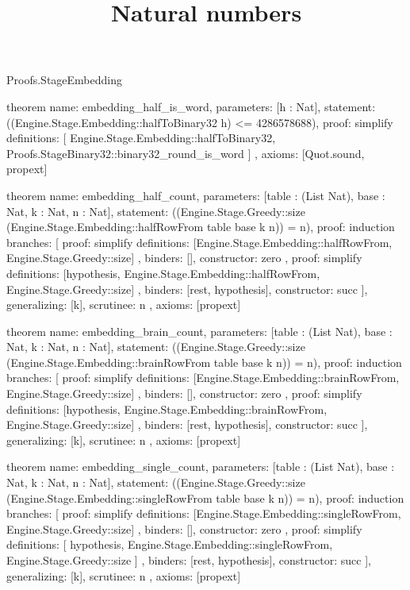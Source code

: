 \begin{lexlean}{Proofs.StageEmbedding}
\title{Natural numbers}
\begin{semanticmodule}
theorem{
  name: embedding_half_is_word,
  parameters: [h : Nat],
  statement: ((Engine.Stage.Embedding::halfToBinary32 h) <= 4286578688),
  proof: simplify{
    definitions: [
      Engine.Stage.Embedding::halfToBinary32,
      Proofs.StageBinary32::binary32_round_is_word
    ]
  },
  axioms: [Quot.sound, propext]
}

theorem{
  name: embedding_half_count,
  parameters: [table : (List Nat), base : Nat, k : Nat, n : Nat],
  statement: ((Engine.Stage.Greedy::size (Engine.Stage.Embedding::halfRowFrom table base k n)) = n),
  proof: induction{
    branches: [
      {
        proof: simplify{
          definitions: [Engine.Stage.Embedding::halfRowFrom, Engine.Stage.Greedy::size]
        },
        binders: [],
        constructor: zero
      },
      {
        proof: simplify{
          definitions: [hypothesis, Engine.Stage.Embedding::halfRowFrom, Engine.Stage.Greedy::size]
        },
        binders: [rest, hypothesis],
        constructor: succ
      }
    ],
    generalizing: [k],
    scrutinee: n
  },
  axioms: [propext]
}

theorem{
  name: embedding_brain_count,
  parameters: [table : (List Nat), base : Nat, k : Nat, n : Nat],
  statement: ((Engine.Stage.Greedy::size (Engine.Stage.Embedding::brainRowFrom table base k n)) = n),
  proof: induction{
    branches: [
      {
        proof: simplify{
          definitions: [Engine.Stage.Embedding::brainRowFrom, Engine.Stage.Greedy::size]
        },
        binders: [],
        constructor: zero
      },
      {
        proof: simplify{
          definitions: [hypothesis, Engine.Stage.Embedding::brainRowFrom, Engine.Stage.Greedy::size]
        },
        binders: [rest, hypothesis],
        constructor: succ
      }
    ],
    generalizing: [k],
    scrutinee: n
  },
  axioms: [propext]
}

theorem{
  name: embedding_single_count,
  parameters: [table : (List Nat), base : Nat, k : Nat, n : Nat],
  statement: ((Engine.Stage.Greedy::size (Engine.Stage.Embedding::singleRowFrom table base k n)) = n),
  proof: induction{
    branches: [
      {
        proof: simplify{
          definitions: [Engine.Stage.Embedding::singleRowFrom, Engine.Stage.Greedy::size]
        },
        binders: [],
        constructor: zero
      },
      {
        proof: simplify{
          definitions: [
            hypothesis,
            Engine.Stage.Embedding::singleRowFrom,
            Engine.Stage.Greedy::size
          ]
        },
        binders: [rest, hypothesis],
        constructor: succ
      }
    ],
    generalizing: [k],
    scrutinee: n
  },
  axioms: [propext]
}


\end{semanticmodule}
\end{lexlean}
